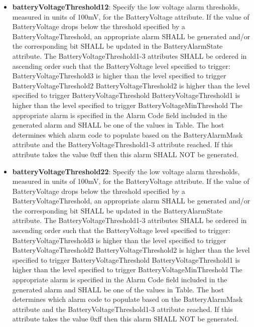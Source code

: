 \begin{itemize}
\item \textbf{batteryVoltageThreshold12}: Specify the low voltage alarm thresholds, measured in units of 100mV, for the BatteryVoltage attribute. If the value of BatteryVoltage drops below the threshold specified by a BatteryVoltageThreshold, an appropriate alarm SHALL be generated and/or the corresponding bit SHALL be updated in the BatteryAlarmState attribute. The BatteryVoltageThreshold1-3 attributes SHALL be ordered in ascending order such that the BatteryVoltage level specified to trigger: BatteryVoltageThreshold3 is higher than the level specified to trigger BatteryVoltageThreshold2 BatteryVoltageThreshold2 is higher than the level specified to trigger BatteryVoltageThreshold BatteryVoltageThreshold1 is higher than the level specified to trigger BatteryVoltageMinThreshold The appropriate alarm is specified in the Alarm Code field included in the generated alarm and SHALL be one of the values in Table. The host determines which alarm code to populate based on the BatteryAlarmMask attribute and the BatteryVoltageThreshold1-3 attribute reached. If this attribute takes the value 0xff then this alarm SHALL NOT be generated.
\item \textbf{batteryVoltageThreshold22}: Specify the low voltage alarm thresholds, measured in units of 100mV, for the BatteryVoltage attribute. If the value of BatteryVoltage drops below the threshold specified by a BatteryVoltageThreshold, an appropriate alarm SHALL be generated and/or the corresponding bit SHALL be updated in the BatteryAlarmState attribute. The BatteryVoltageThreshold1-3 attributes SHALL be ordered in ascending order such that the BatteryVoltage level specified to trigger: BatteryVoltageThreshold3 is higher than the level specified to trigger BatteryVoltageThreshold2 BatteryVoltageThreshold2 is higher than the level specified to trigger BatteryVoltageThreshold BatteryVoltageThreshold1 is higher than the level specified to trigger BatteryVoltageMinThreshold The appropriate alarm is specified in the Alarm Code field included in the generated alarm and SHALL be one of the values in Table. The host determines which alarm code to populate based on the BatteryAlarmMask attribute and the BatteryVoltageThreshold1-3 attribute reached. If this attribute takes the value 0xff then this alarm SHALL NOT be generated.

\end{itemize}
